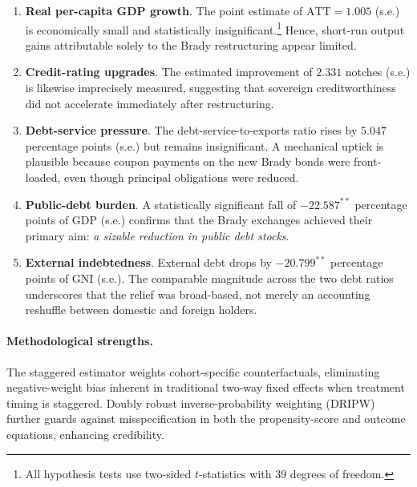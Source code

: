 \begin{enumerate}[label=(\arabic*),leftmargin=1.25cm]
    \item \textbf{Real per-capita GDP growth}.  
    The point estimate of \(\text{ATT}=1.005\) (s.e.) is economically small and statistically insignificant.\footnote{All hypothesis tests use two-sided $t$-statistics with 39 degrees of freedom.}  
    Hence, short-run output gains attributable solely to the Brady restructuring appear limited.

    \item \textbf{Credit-rating upgrades}.  
    The estimated improvement of \(2.331\) notches (s.e.) is likewise imprecisely measured, suggesting that sovereign creditworthiness did not accelerate immediately after restructuring.

    \item \textbf{Debt-service pressure}.  
    The debt-service-to-exports ratio rises by \(5.047\) percentage points (s.e.) but remains insignificant.  
    A mechanical uptick is plausible because coupon payments on the new Brady bonds were front-loaded, even though principal obligations were reduced.

    \item \textbf{Public-debt burden}.  
    A statistically significant fall of \(-22.587^{**}\) percentage points of GDP (s.e.) confirms that the Brady exchanges achieved their primary aim: \emph{a sizable reduction in public debt stocks}.

    \item \textbf{External indebtedness}.  
    External debt drops by \(-20.799^{**}\) percentage points of GNI (s.e.).  
    The comparable magnitude across the two debt ratios underscores that the relief was broad-based, not merely an accounting reshuffle between domestic and foreign holders.
\end{enumerate}

\paragraph{Methodological strengths.}
The staggered estimator weights cohort-specific counterfactuals, eliminating negative-weight bias inherent in traditional two-way fixed effects when treatment timing is staggered.  
Doubly robust inverse-probability weighting (DRIPW) further guards against misspecification in both the propensity-score and outcome equations, enhancing credibility.

